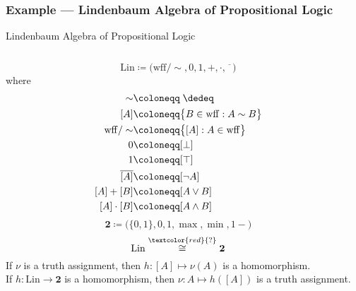 \documentclass[UTF8,aspectratio=43,11pt,colorlinks,compress,openany]{beamer}%
\begin{document}
\begin{frame}\frametitle{Example --- Lindenbaum Algebra of Propositional Logic}
\setlength\abovedisplayskip{0pt}
\setlength\belowdisplayskip{0pt}
	\begin{block}{Lindenbaum Algebra of Propositional Logic}
	\begin{columns}
		\[\mathrm{Lin}\coloneqq \Big(\mathrm{wff}/\sim,0,1,+,\cdot,\overline{\phantom{x}}\Big)\]
		where 
		\begin{align*}
		\sim&\coloneqq \;\dedeq\\
		[A]&\coloneqq \big\{B\in\mathrm{wff}: A\sim B\big\}\\
		\mathrm{wff}/\sim&\coloneqq \big\{[A]: A\in\mathrm{wff}\big\}\\
		0&\coloneqq [\bot]\\
		1&\coloneqq [\top]\\
		\overline{[A]}&\coloneqq [\neg A]\\
		[A]+[B]&\coloneqq [A\vee B]\\
		[A]\cdot[B]&\coloneqq [A\wedge B]
		\end{align*}
		\[\mathbf{2}\coloneqq \Big(\{0,1\},0,1,\max,\min,1-\Big)\]
		\[\mathrm{Lin}\stackrel{\textcolor{red}{?}}{\cong}\mathbf{2}\]
		If $\nu$ is a truth assignment, then $h: [A]\mapsto\nu(A)$ is a homomorphism.\\
		If $h:\mathrm{Lin}\to\mathbf{2}$ is a homomorphism, then $\nu: A\mapsto h([A])$ is a truth assignment.
	\end{columns}
	\end{block}
\end{frame}
\end{document}
